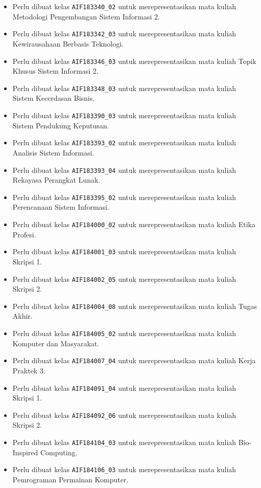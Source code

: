 \documentclass[a4paper,twoside]{article}
\begin{document}
\begin{enumerate}
\begin{enumerate}
\begin{enumerate}
\begin{itemize}
					\item Perlu dibuat kelas \texttt{AIF183340\_02} untuk merepresentasikan mata kuliah Metodologi Pengembangan Sistem Informasi 2.
					\item Perlu dibuat kelas \texttt{AIF183342\_03} untuk merepresentasikan mata kuliah Kewirausahaan Berbasis Teknologi.
					\item Perlu dibuat kelas \texttt{AIF183346\_03} untuk merepresentasikan mata kuliah Topik Khusus Sistem Informasi 2.
					\item Perlu dibuat kelas \texttt{AIF183348\_03} untuk merepresentasikan mata kuliah Sistem Kecerdasan Bisnis.
					\item Perlu dibuat kelas \texttt{AIF183390\_03} untuk merepresentasikan mata kuliah Sistem Pendukung Keputusan.
					\item Perlu dibuat kelas \texttt{AIF183393\_02} untuk merepresentasikan mata kuliah Analisis Sistem Informasi.
					\item Perlu dibuat kelas \texttt{AIF183393\_04} untuk merepresentasikan mata kuliah Rekayasa Perangkat Lunak.
					\item Perlu dibuat kelas \texttt{AIF183395\_02} untuk merepresentasikan mata kuliah Perencanaan Sistem Informasi.
					\item Perlu dibuat kelas \texttt{AIF184000\_02} untuk merepresentasikan mata kuliah Etika Profesi.
					\item Perlu dibuat kelas \texttt{AIF184001\_03} untuk merepresentasikan mata kuliah Skripsi 1.
					\item Perlu dibuat kelas \texttt{AIF184002\_05} untuk merepresentasikan mata kuliah Skripsi 2.
					\item Perlu dibuat kelas \texttt{AIF184004\_08} untuk merepresentasikan mata kuliah Tugas Akhir.
					\item Perlu dibuat kelas \texttt{AIF184005\_02} untuk merepresentasikan mata kuliah Komputer dan Masyarakat.
					\item Perlu dibuat kelas \texttt{AIF184007\_04} untuk merepresentasikan mata kuliah Kerja Praktek 3.
					\item Perlu dibuat kelas \texttt{AIF184091\_04} untuk merepresentasikan mata kuliah Skripsi 1.
					\item Perlu dibuat kelas \texttt{AIF184092\_06} untuk merepresentasikan mata kuliah Skripsi 2.
					\item Perlu dibuat kelas \texttt{AIF184104\_03} untuk merepresentasikan mata kuliah Bio-Inspired Computing.
					\item Perlu dibuat kelas \texttt{AIF184106\_03} untuk merepresentasikan mata kuliah Pemrograman Permainan Komputer.

\end{itemize}
\end{enumerate}
\end{enumerate}
\end{enumerate}
\end{document}
